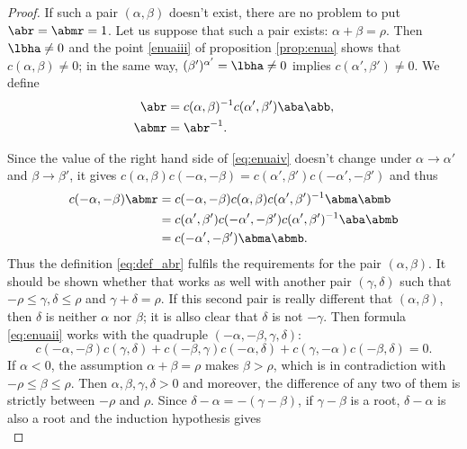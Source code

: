 \begin{proof}
If such a pair $(\alpha,\beta)$ doesn't exist, there are no problem to put $\abr=\abmr=1$. Let us suppose that such a pair exists: $\alpha+\beta=\rho$. Then $\lbha\neq 0$ and the point \ref{enuaiii} of proposition \ref{prop:enua} shows that $c(\alpha,\beta)\neq 0$; in the same way, $(\beta')^{\alpha'}=\lbha\neq 0$ implies $c(\alpha',\beta')\neq 0$. We define
\begin{subequations}\label{eq:def_abr}
\begin{align}
\abr&=c(\alpha,\beta)^{-1} c(\alpha',\beta')\aba\abb,\\
\abmr&=\abr^{-1}.
\end{align}   
\end{subequations}


Since the value of the right hand side of \eqref{eq:enuaiv} doesn't change under $\alpha\to\alpha'$ and $\beta\to\beta'$, it gives  $c(\alpha,\beta)c(-\alpha,-\beta)=c(\alpha',\beta')c(-\alpha',-\beta')$ and thus
\begin{equation}
\begin{split}
c(-\alpha,-\beta)\abmr&=c(-\alpha,-\beta)c(\alpha,\beta)c(\alpha',\beta')^{-1}\abma\abmb\\
&=c(\alpha',\beta')c(-\alpha',-\beta')c(\alpha',\beta')^{-1}\aba\abmb\\
&=c(-\alpha',-\beta')\abma\abmb.
\end{split}
\end{equation}
Thus the definition \eqref{eq:def_abr} fulfils the requirements for the pair $(\alpha,\beta)$. It should be shown whether that works as well with another pair $(\gamma,\delta)$ such that $-\rho\leq\gamma,\delta\leq\rho$ and $\gamma+\delta=\rho$. If this second pair is really different that $(\alpha,\beta)$, then $\delta$ is neither $\alpha$ nor $\beta$; it is allso clear that $\delta$ is not $-\gamma$. Then formula \eqref{eq:enuaii}  works with the quadruple $(-\alpha,-\beta,\gamma,\delta)$:
\begin{equation}\label{eq:c_un}
c(-\alpha,-\beta)c(\gamma,\delta)+c(-\beta,\gamma)c(-\alpha,\delta)+c(\gamma,-\alpha)c(-\beta,\delta)=0.
\end{equation}
If $\alpha<0$, the assumption $\alpha+\beta=\rho$ makes $\beta>\rho$, which is in contradiction with $-\rho\leq\beta\leq\rho$. Then $\alpha,\beta,\gamma,\delta>0$ and moreover, the difference of any two of them is strictly between $-\rho$ and $\rho$. Since $\delta-\alpha=-(\gamma-\beta)$, if $\gamma-\beta$ is a root, $\delta-\alpha$ is also a root and the induction hypothesis gives
\begin{subequations}\label{eq:c_deux_un}

\end{subequations}
\end{proof}
